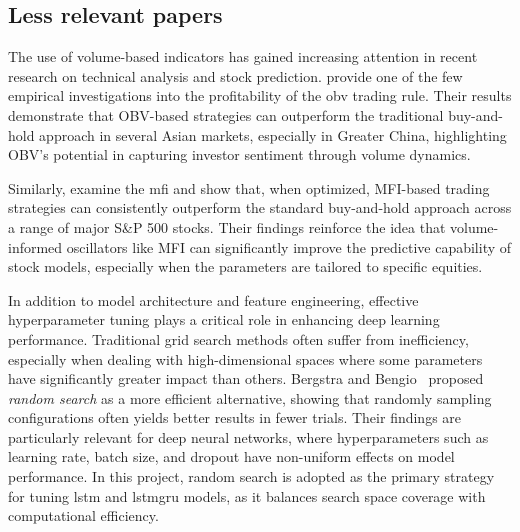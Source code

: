 \subsection{Less relevant papers}

The use of volume-based indicators has gained increasing attention in recent research 
on technical analysis and stock prediction. \parencite{tsang2009OBV} provide one of the
few empirical investigations into the profitability of the \acrfull{obv} trading rule.
Their results demonstrate that OBV-based strategies can outperform the traditional
buy-and-hold approach in several Asian markets, especially in Greater China, 
highlighting OBV's potential in capturing investor sentiment through volume dynamics.

Similarly,\parencite{marek2020mfi} examine the \acrfull{mfi} and show that, when 
optimized, MFI-based trading strategies can consistently outperform the standard 
buy-and-hold approach across a range of major S\&P 500 stocks. Their findings 
reinforce the idea that volume-informed oscillators like MFI can significantly
improve the predictive capability of stock models, especially when the parameters 
are tailored to specific equities.

In addition to model architecture and feature engineering, effective hyperparameter tuning plays a critical role in 
enhancing deep learning performance. Traditional grid search methods often suffer from inefficiency, especially when 
dealing with high-dimensional spaces where some parameters have significantly greater impact than others. Bergstra and 
Bengio~\parencite{bergstra2012random} proposed \emph{random search} as a more efficient alternative, showing that randomly 
sampling configurations often yields better results in fewer trials. Their findings are particularly relevant for deep 
neural networks, where hyperparameters such as learning rate, batch size, and dropout have non-uniform effects on model 
performance. In this project, random search is adopted as the primary strategy for tuning \acrshort{lstm} and 
\acrshort{lstmgru} models, as it balances search space coverage with computational efficiency.
